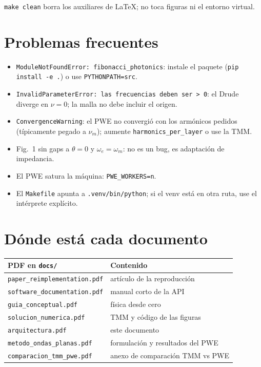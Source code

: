 \documentclass[11pt,a4paper]{article}
\begin{document}
\texttt{make clean} borra los auxiliares de LaTeX; no toca figuras ni el
entorno virtual.

\section{Problemas frecuentes}

\begin{itemize}
\item \texttt{ModuleNotFoundError: fibonacci\_photonics}: instale el paquete
(\texttt{pip install -e .}) o use \texttt{PYTHONPATH=src}.
\item \texttt{InvalidParameterError: las frecuencias deben ser > 0}: el Drude
diverge en \(\nu=0\); la malla no debe incluir el origen.
\item \texttt{ConvergenceWarning}: el PWE no convergió con los armónicos
pedidos (típicamente pegado a \(\nu_m\)); aumente
\texttt{harmonics\_per\_layer} o use la TMM.
\item Fig.~1 sin gaps a \(\theta=0\) y \(\omega_e=\omega_m\): no es un bug,
es adaptación de impedancia.
\item El PWE satura la máquina: \texttt{PWE\_WORKERS=n}.
\item El \texttt{Makefile} apunta a \texttt{.venv/bin/python}; si el venv
está en otra ruta, use el intérprete explícito.
\end{itemize}

\section{Dónde está cada documento}

\begin{center}
\begin{tabular}{ll}
\toprule
PDF en \texttt{docs/} & Contenido \\
\midrule
\texttt{paper\_reimplementation.pdf} & artículo de la reproducción \\
\texttt{software\_documentation.pdf} & manual corto de la API \\
\texttt{guia\_conceptual.pdf} & física desde cero \\
\texttt{solucion\_numerica.pdf} & TMM y código de las figuras \\
\texttt{arquitectura.pdf} & este documento \\
\texttt{metodo\_ondas\_planas.pdf} & formulación y resultados del PWE \\
\texttt{comparacion\_tmm\_pwe.pdf} & anexo de comparación TMM vs PWE \\
\bottomrule
\end{tabular}
\end{center}
\end{document}
